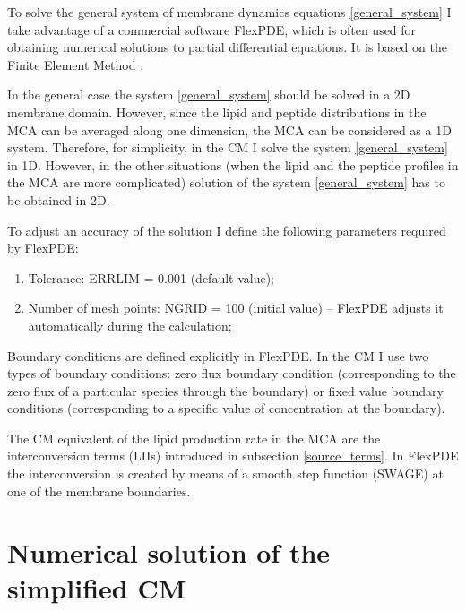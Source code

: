 To solve the general system of membrane dynamics equations \eqref{general_system} I take advantage of a commercial software FlexPDE, which is often used for obtaining numerical solutions to partial differential equations. It is based on the Finite Element Method \cite{Zienkiewicz2005}.

In the general case the system \eqref{general_system} should be solved in a 2D membrane domain. However, since the lipid and peptide distributions in the MCA can be averaged along one dimension, the MCA can be considered as a 1D system. Therefore, for simplicity, in the CM I solve the system \eqref{general_system} in 1D. However, in the other situations (when the lipid and the peptide profiles in the MCA are more complicated) solution of the system \eqref{general_system} has to be obtained in 2D.

To adjust an accuracy of the solution I define the following parameters required by FlexPDE:

\begin{enumerate}
 \item Tolerance: ERRLIM = 0.001 (default value);
 \item Number of mesh points: NGRID = 100 (initial value) -- FlexPDE adjusts it automatically during the calculation;
\end{enumerate}

Boundary conditions are defined explicitly in FlexPDE. In the CM I use two types of boundary conditions: zero flux boundary condition (corresponding to the zero flux of a particular species through the boundary) or fixed value boundary conditions (corresponding to a specific value of concentration at the boundary). 

The CM equivalent of the lipid production rate in the MCA are the interconversion terms (LIIs) introduced in subsection \ref{source_terms}. In FlexPDE the interconversion is created by means of a smooth step function (SWAGE) at one of the membrane boundaries.

\section{Numerical solution of the simplified CM}

\label{numerical_solution}

